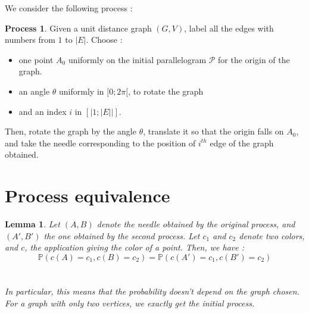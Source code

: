 \documentclass[a4paper,11pt]{article}
\newtheorem{lemma}{Lemma}
\theoremstyle{definition}
\newtheorem{process}{Process}
\theoremstyle{remark}
\begin{document}
We consider the following process : \\
\begin{process}
Given a unit distance graph $(G,V)$, label all the edges with numbers from $1$ to $|E|$. Choose : 
\begin{itemize}
\item one point $A_0$ uniformly on the initial parallelogram $\mathcal{P}$ for the origin of the graph.
\item an angle $\theta$ uniformly in $[0;2\pi[$, to rotate the graph
\item and an index $i$ in $[|1;|E||]$.
\end{itemize}
Then, rotate the graph by the angle $\theta$, translate it so that the origin falls on  $A_0$, and take the needle corresponding to the position of $i^{th}$ edge of the graph obtained. 
\end{process}
\vspace{1 cm} 

\section{Process equivalence}
\begin{lemma}\label{huitre}
Let $(A,B)$ denote the needle obtained by the original process, and
$(A',B')$ the one obtained by the second process. Let $c_1$ and $c_2$ denote two colors, and $c$, the application giving the color of a point. Then, we have :\\
 $$\mathbb{P}(c(A) = c_1 , c(B) = c_2) = \mathbb{P}(c(A') = c_1, c(B') = c_2) $$ \\
 \\
 In particular, this means that the probability doesn't depend on the graph chosen. For a graph with only two vertices, we exactly get the initial process.
\end{lemma}
\end{document}
